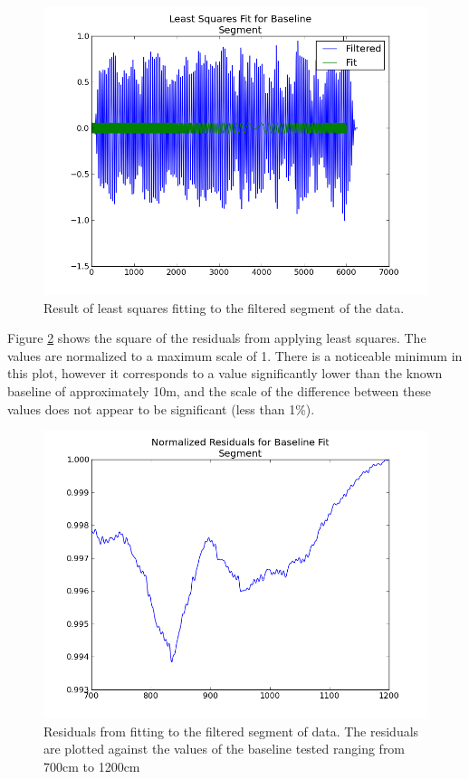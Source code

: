 \documentclass{article}
\begin{document}
    \begin{figure}[h!]
    \centering
    \includegraphics[scale=0.5]{img/crab/fit_baseline_seg.png}
    \caption{Result of least squares fitting to the filtered segment of the data.}
    \label{fig:fit_baseline_seg}
    \end{figure}

    Figure \ref{fig:residual_baseline_seg} shows the square of the residuals
    from applying least squares. The values are normalized to a maximum scale of
    1. There is a noticeable minimum in this plot, however it corresponds to a
    value significantly lower than the known baseline of approximately 10m, and
    the scale of the difference between these values does not appear to be
    significant (less than 1\%).

    \begin{figure}[h!]
    \centering
    \includegraphics[scale=0.5]{img/crab/residual_baseline_seg.png}
    \caption{Residuals from fitting to the filtered segment of data.
    The residuals are plotted against the values of the baseline
tested ranging from 700cm to 1200cm}
    \label{fig:residual_baseline_seg}
    \end{figure}
\end{document}
